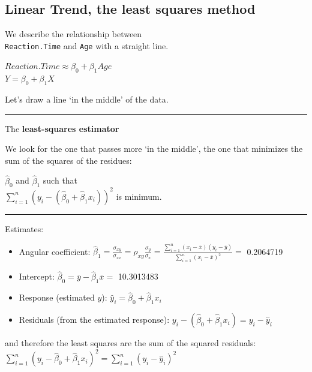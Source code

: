 \documentclass[]{article}
\providecommand{\tightlist}{%
  \setlength{\itemsep}{0pt}\setlength{\parskip}{0pt}}
\begin{document}
\subsection{Linear Trend, the least squares
method}\label{linear-trend-the-least-squares-method}

We describe the relationship between\\
\texttt{Reaction.Time} and \texttt{Age} with a straight line.

\(Reaction.Time \approx \beta_0 + \beta_1 Age\)\\
\(Y=\beta_0 + \beta_1X\)

Let's draw a line `in the middle' of the data.

\begin{center}\rule{0.5\linewidth}{\linethickness}\end{center}

The \textbf{least-squares estimator}

We look for the one that passes more `in the middle', the one that
minimizes the sum of the squares of the residues:

\(\hat{\beta}_0\) and \(\hat{\beta}_1\) such that\\
\(\sum_{i=1} ^ n (y_i - (\hat{\beta}_0 + \hat{\beta}_1x_i )) ^ 2\) is
minimum.

\begin{center}\rule{0.5\linewidth}{\linethickness}\end{center}

Estimates:

\begin{itemize}
\tightlist
\item
  Angular coefficient:
  \(\hat{\beta}_1=\frac{\sigma_{xy}}{\sigma_{xx}}=\rho_{xy}\frac{\sigma_{y}}{\sigma_{x}}=\frac{\sum_{i=1}^n(x_i- \bar{x})(y_i-\bar{y})}{\sum_{i=1}^n (x_i-\bar{x})^2}=\)
  0.2064719\\
\item
  Intercept: \(\hat{\beta}_0=\bar{y}-\hat{\beta}_1\bar{x}=\) 10.3013483
\item
  Response (estimated \(y\)):
  \(\hat{y}_i=\hat{\beta}_0 + \hat{\beta}_1x_i\)
\item
  Residuals (from the estimated response):
  \(y_i - (\hat{\beta}_0 + \hat{\beta}_1 x_i)=y_i- \hat{y}_i\)
\end{itemize}

and therefore the least squares are the sum of the squared residuals:
\(\sum_{i=1} ^ n (y_i- \hat{\beta}_0 + \hat{\beta}_1x_i) ^ 2=\sum_{i=1} ^ n (y_i- \hat{y}_i ) ^ 2\)
\end{document}
